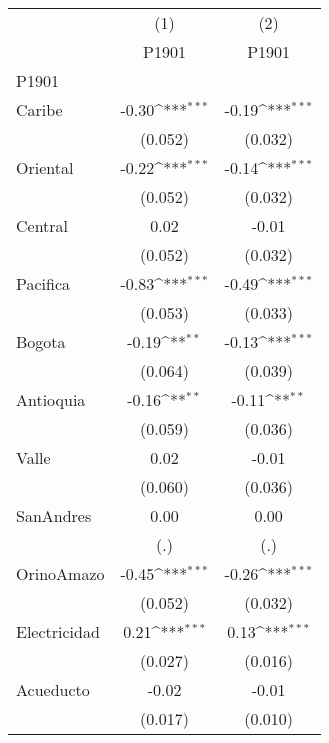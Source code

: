 {
\def\sym#1{\ifmmode^{#1}\else\(^{#1}\)\fi}
\begin{tabular}{l*{2}{c}}
\hline\hline
            &\multicolumn{1}{c}{(1)}&\multicolumn{1}{c}{(2)}\\
            &\multicolumn{1}{c}{P1901}&\multicolumn{1}{c}{P1901}\\
\hline
P1901       &                     &                     \\
Caribe      &       -0.30\sym{***}&       -0.19\sym{***}\\
            &     (0.052)         &     (0.032)         \\
[1em]
Oriental    &       -0.22\sym{***}&       -0.14\sym{***}\\
            &     (0.052)         &     (0.032)         \\
[1em]
Central     &        0.02         &       -0.01         \\
            &     (0.052)         &     (0.032)         \\
[1em]
Pacifica    &       -0.83\sym{***}&       -0.49\sym{***}\\
            &     (0.053)         &     (0.033)         \\
[1em]
Bogota      &       -0.19\sym{**} &       -0.13\sym{***}\\
            &     (0.064)         &     (0.039)         \\
[1em]
Antioquia   &       -0.16\sym{**} &       -0.11\sym{**} \\
            &     (0.059)         &     (0.036)         \\
[1em]
Valle       &        0.02         &       -0.01         \\
            &     (0.060)         &     (0.036)         \\
[1em]
SanAndres   &        0.00         &        0.00         \\
            &         (.)         &         (.)         \\
[1em]
OrinoAmazo  &       -0.45\sym{***}&       -0.26\sym{***}\\
            &     (0.052)         &     (0.032)         \\
[1em]
Electricidad&        0.21\sym{***}&        0.13\sym{***}\\
            &     (0.027)         &     (0.016)         \\
[1em]
Acueducto   &       -0.02         &       -0.01         \\
            &     (0.017)         &     (0.010)         \\

\end{tabular}}

